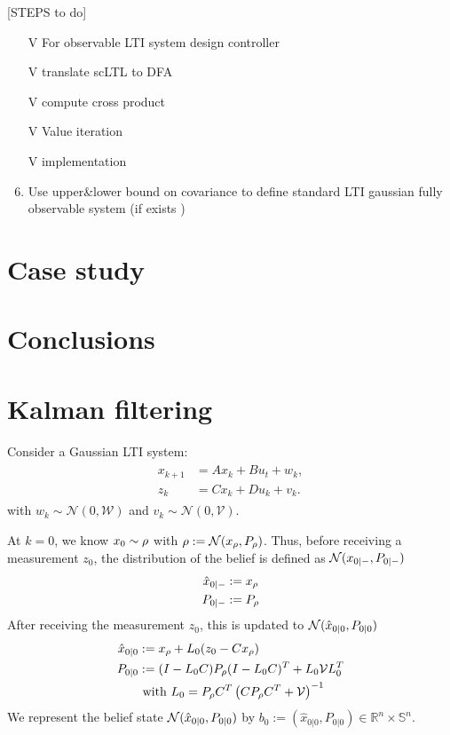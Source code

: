 \documentclass{ifacconf}
\newcommand{\red}[1]{{\color{red} #1}}
\begin{document}
 \noindent{\textbf{}}

    
    \red{[STEPS to do]
  \begin{enumerate}
  	\item[V] For observable LTI system design controller
  	\item[V] translate scLTL to DFA
  	\item[V] compute cross product
  	\item[V] Value iteration
  	\item[V] implementation
  	  	\item Use upper\&lower bound on covariance to define standard LTI gaussian fully observable system (if exists )  
  \end{enumerate}
  
  
  }
    
    \section{Case study}
    
  
\section{Conclusions}






\appendix

\section{Kalman filtering}
Consider a Gaussian LTI system:
 \begin{align}  \begin{aligned}
x_{k+1}&=A x_{k} + B u_t+ w_k,\\
z_k&=Cx_k+Du_k+v_k.\end{aligned} \end{align}
with $w_k\sim \mathcal N(0, \mathcal W)$ and $v_k\sim \mathcal N (0,\mathcal V)$.

At $k=0$, we know $x_0\sim \rho$ with $\rho:=\mathcal N(x_\rho,P_\rho)$.
Thus,  before receiving a measurement $z_0$, the distribution of the belief is defined as $\mathcal{N}(x_{0|-}, P_{0|-})$
\begin{align}
	\hat x_{0|-}&:= x_\rho\\
	P_{0|-}&:= P_{\rho}
\end{align}
After receiving the measurement $z_0$, this is updated to $\mathcal{N}(\hat x_{0|0}, P_{0|0})$
\begin{align}
	\hat x_{0|0}&:= x_\rho+ L_0 (z_0-Cx_\rho)\\
	P_{0|0}&:=(I-L_0 C) P_{\rho}(I-L_0 C)^T+L_0\mathcal{V} L_0^T\\
	& \mbox{ with } L_0=P_{\rho}C^T\left(CP_{\rho}C^T+\mathcal V\right)^{-1}
\end{align}
We represent the belief state  $\mathcal{N}(\hat x_{0|0}, P_{0|0})$ by $b_0:=(\hat x_{0|0}, P_{0|0})\in\mathbb R^n\times \mathbb S^n$.
\end{document}
